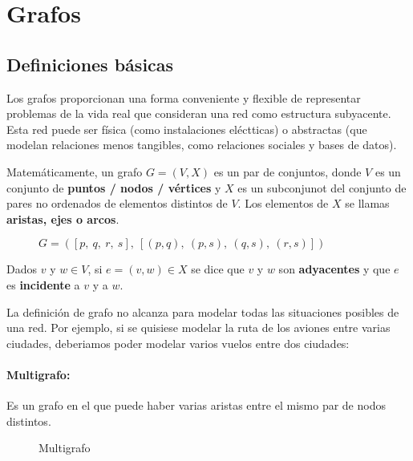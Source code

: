 \section{Grafos}
\subsection{Definiciones básicas}
Los grafos proporcionan una forma conveniente y flexible de representar problemas de la vida real que consideran una red como estructura subyacente. Esta red puede ser física (como instalaciones eléctticas) o abstractas (que modelan relaciones menos tangibles, como relaciones sociales y bases de datos).

Matemáticamente, un grafo \(G = (V,X)\) es un par de conjuntos, donde \(V\) es un conjunto de \textbf{puntos / nodos / vértices} y \(X\) es un subconjunot del conjunto de pares no ordenados de elementos distintos de \(V\). Los elementos de \(X\) se llamas \textbf{aristas, ejes o arcos}.

\begin{figure}[H]
\begin{center}

\end{center}
	\caption{\(G =([p,~q,~r,~s],~[(p,q),~(p,s),~(q,s),~(r,s)])\)
	}
\end{figure}

Dados \(v\) y \(w \in V\), si \(e=(v,w)\in X\) se dice que \(v\) y \(w\) son \textbf{adyacentes} y que \(e\) es \textbf{incidente} a \(v\) y a \(w\).

La definición de grafo no alcanza para modelar todas las situaciones posibles de una red. Por ejemplo, si se quisiese modelar la ruta de los aviones entre varias ciudades, deberiamos poder modelar varios vuelos entre dos ciudades:
 
\paragraph{Multigrafo:} Es un grafo en el que puede haber varias aristas entre el mismo par de nodos distintos.
		\begin{figure}[H]
	\begin{center}
	\end{center}		
	\caption{Multigrafo}
\end{figure}

